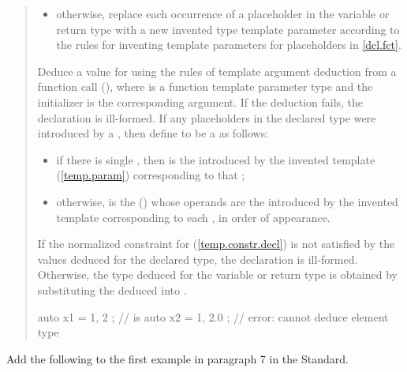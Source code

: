 \begin{quote}
\begin{addedblock}
\begin{itemize}
\item otherwise, replace each occurrence of a placeholder in the
variable or return type with a new invented type template parameter
according to the rules for inventing template parameters
for placeholders in \ref{dcl.fct}. 
\end{itemize}
\end{addedblock}
% 
Deduce a value for   using the rules of template argument deduction from 
a function call (), where  is a function 
template parameter type and the initializer is the corresponding argument.
%
If the deduction fails, the declaration is ill-formed.
% 
If any placeholders in the declared type were introduced by a
, then define  to be a
 as follows:
\begin{itemize}
\item if there is single ,
then  is the  introduced
by the invented template  (\ref{temp.param})
corresponding to that ;
\item otherwise,  is the 
() whose operands are the 
 introduced by the invented
template  corresponding to
each , in order of appearance.
\end{itemize}
% 
If the normalized constraint for  (\ref{temp.constr.decl}) is not 
satisfied by the values deduced for the declared type, the declaration is 
ill-formed.
% 
Otherwise, the type deduced for the variable or return type is obtained by 
substituting the deduced   into .
% 
\enterexample
\begin{codeblock}
auto x1 = { 1, 2 };    //   is 
auto x2 = { 1, 2.0 };  // error: cannot deduce element type
\end{codeblock}
\exitexample
\end{quote}

Add the following to the first example in paragraph 7 in the \Cpp Standard.

